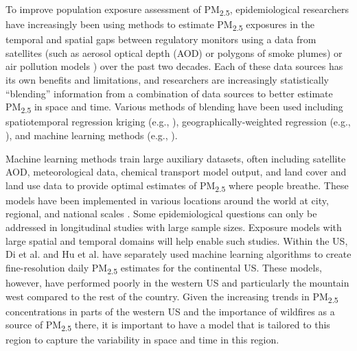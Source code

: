 \documentclass[english]{article}
\begin{document}
To improve population exposure assessment of PM\textsubscript{2.5}, epidemiological researchers have increasingly been using methods to estimate PM\textsubscript{2.5} exposures in the temporal and spatial gaps between regulatory monitors using a data from satellites (such as aerosol optical depth (AOD) or polygons of smoke plumes) or air pollution models \cite{brokamp_assessing_2019, LIU2015120}) over the past two decades. Each of these data sources has its own benefits and limitations, and researchers are increasingly statistically “blending” information from a combination of data sources to better estimate PM\textsubscript{2.5} in space and time. Various methods of blending have been used including spatiotemporal regression kriging (e.g., \cite{hu_satellite-based_2019}), geographically-weighted regression (e.g., \cite{lassman_spatial_2017}), and machine learning methods (e.g., \cite{reid_spatiotemporal_2015, hu_estimating_2017, di_assessing_2016}). 

Machine learning methods train large auxiliary datasets, often including satellite %
AOD, meteorological data, chemical transport model output, and land cover and land use data to provide optimal estimates of PM\textsubscript{2.5} where people breathe. These models have been implemented in various locations around the world at city, regional, and national scales \cite{bellinger_systematic_2017}. Some epidemiological questions can only be addressed in longitudinal studies with large sample sizes. Exposure models with large spatial and temporal domains will help enable such studies. Within the US, Di et al. \cite{di_assessing_2016, di_ensemble-based_2019} and Hu et al. \cite{hu_estimating_2017} have separately used machine learning algorithms to create fine-resolution daily PM\textsubscript{2.5} estimates for the continental US. %
These models, however, have performed poorly in the western US  \cite{di_assessing_2016,hu_estimating_2017} and particularly the mountain west \cite{di_ensemble-based_2019} compared to the rest of the country. Given the increasing trends in PM\textsubscript{2.5} concentrations in parts of the western US and the importance of wildfires as a source of PM\textsubscript{2.5} there, it is important to have a model that is tailored to this region to capture the variability in space and time in this region.
\end{document}
